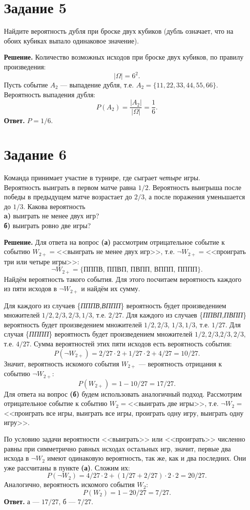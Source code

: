 \documentclass[a4paper,12pt]{article}
\begin{document}
\section*{Задание 5}
Найдите вероятность дубля при броске двух кубиков (дубль означает, что на обоих кубиках выпало одинаковое значение).\par
{\noindent \bf Решение.} Количество возможных исходов при броске двух кубиков, по правилу произведения:
$$|\Omega| = 6^2.$$
Пусть событие $A_2$ --- выпадение дубля, т.е. $A_2=\{11,22,33,44,55,66\}$.\\
Вероятность выпадения дубля:
$$P(A_2)=\frac{|A_2|}{|\Omega|}=\frac{1}{6}.$$
{\bf Ответ.}  $P=1/6$.\par

\section*{Задание 6}
Команда принимает участие в турнире, где сыграет {\it четыре} игры.\\
Вероятность выиграть в первом матче равна $1/2$. Вероятность выигрыша после победы в предыдущем матче возрастает до $2/3$, а после поражения уменьшается до $1/3$. Какова вероятность\\
{\bf a)} выиграть не менее двух игр?\\
{\bf б)} выиграть ровно две игры?\par
{\noindent \bf Решение.} Для ответа на вопрос {\bf(а)} рассмотрим отрицательное событие к событию $W_{2+}=$<<выиграть не менее двух игр>>, т.е. $\neg W_{2+}=$<<проиграть три или четыре игры>>:
$$\neg W_{2+}=\{\textit{ПППВ, ППВП, ПВПП, ВППП, ПППП}\}.$$
Найдём вероятность такого события. Для этого посчитаем вероятность каждого из пяти исходов в $\neg W_{2+}$ и найдём их сумму. \par
Для каждого из случаев \{\textit{ПППВ,ВППП}\} вероятность будет произведением множителей $1/2,2/3,2/3,1/3$, т.е. $2/27$.
Для каждого из случаев \{\textit{ППВП,ПВПП}\} вероятность будет произведением множителей $1/2,2/3$, $1/3,1/3$, т.е. $1/27$.
Для случая \{\textit{ПППП}\} вероятность будет произведением множителей $1/2,2/3$,$2/3,2/3$, т.е. $4/27$.
Сумма вероятностей этих пяти исходов есть вероятность события:
$$P(\neg W_{2+})=2/27\cdot2+1/27\cdot2+4/27=10/27.$$
Значит, вероятность искомого события $W_{2+}$ --- вероятность отрицания к событию $\neg W_{2+}$:
$$P(W_{2+})=1-10/27=17/27.$$
Для ответа на вопрос {\bf(б)} будем использовать аналогичный подход. Рассмотрим отрицательное событие к событию $W_{2}=$<<выиграть две игры>>, т.е. $\neg W_{2}=$<<проиграть все игры, выиграть все игры, проиграть одну игру, выиграть одну игру>>. \par По условию задачи вероятности <<выиграть>> или <<проиграть>> численно равны при симметрично равных исходах остальных игр, значит, первые два исхода в $\neg W_{2}$ имеют одинаковую вероятность, так же, как и два последних. Они уже рассчитаны в пункте {\bf(а)}. Сложим их:
$$P(\neg W_{2})=4/27\cdot2+(1/27+2/27)\cdot2\cdot2=20/27.$$
Аналогично, вероятность искомого события $W_{2}$:
$$P(W_{2})=1-20/27=7/27.$$
{\bf Ответ.} а --- $17/27$, б --- $7/27$. \par
\end{document}
